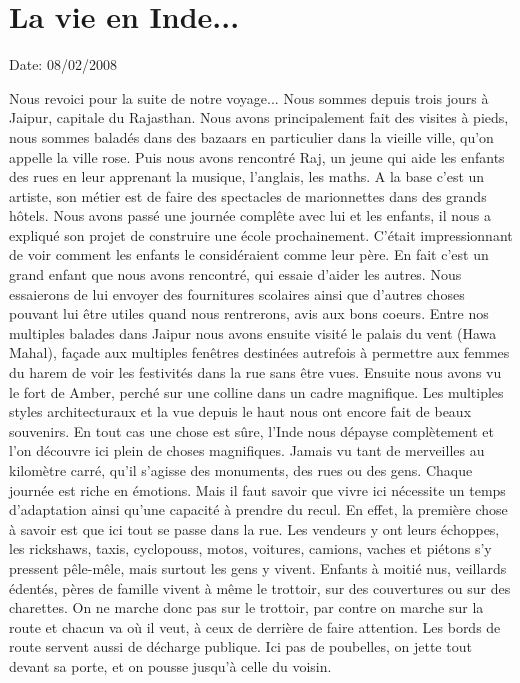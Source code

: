 \section{La vie en Inde...}

Date: 08/02/2008

\begin{multicols}{2}

Nous revoici pour la suite de notre voyage... Nous sommes depuis trois jours à Jaipur, capitale du Rajasthan. Nous avons principalement fait des visites à pieds, nous sommes baladés dans des bazaars en particulier dans la vieille ville, qu'on appelle la ville rose. Puis nous avons rencontré Raj, un jeune qui aide les enfants des rues en leur apprenant la musique, l'anglais, les maths. A la base c'est un artiste, son métier est de faire des spectacles de marionnettes dans des grands hôtels. Nous avons passé une journée complête avec lui et les enfants, il nous a expliqué son projet de construire une école prochainement. C'était impressionnant de voir comment les enfants le considéraient comme leur père. En fait c'est un grand enfant que nous avons rencontré, qui essaie d'aider les autres. Nous essaierons de lui envoyer des fournitures scolaires ainsi que d'autres choses pouvant lui être utiles quand nous rentrerons, avis aux bons coeurs. Entre nos multiples balades dans Jaipur nous avons ensuite visité le palais du vent (Hawa Mahal), façade aux multiples fenêtres destinées autrefois à permettre aux femmes du harem de voir les festivités dans la rue sans être vues. Ensuite nous avons vu le fort de Amber, perché sur une colline dans un cadre magnifique. Les multiples styles architecturaux et la vue depuis le haut nous ont encore fait de beaux souvenirs. En tout cas une chose est sûre, l'Inde nous dépayse complètement et l'on découvre ici plein de choses magnifiques. Jamais vu tant de merveilles au kilomètre carré, qu'il s'agisse des monuments, des rues ou des gens. Chaque journée est riche en émotions. Mais il faut savoir que vivre ici nécessite un temps d'adaptation ainsi qu'une capacité à prendre du recul. En effet, la première chose à savoir est que ici tout se passe dans la rue. Les vendeurs y ont leurs échoppes, les rickshaws, taxis, cyclopouss, motos, voitures, camions, vaches et piétons s'y pressent pêle-mêle, mais surtout les gens y vivent. Enfants à moitié nus, veillards édentés, pères de famille vivent à même le trottoir, sur des couvertures ou sur des charettes. On ne marche donc pas sur le trottoir, par contre on marche sur la route et chacun va où il veut, à ceux de derrière de faire attention. Les bords de route servent aussi de décharge publique. Ici pas de poubelles, on jette tout devant sa porte, et on pousse jusqu'à celle du voisin.


\end{multicols}
